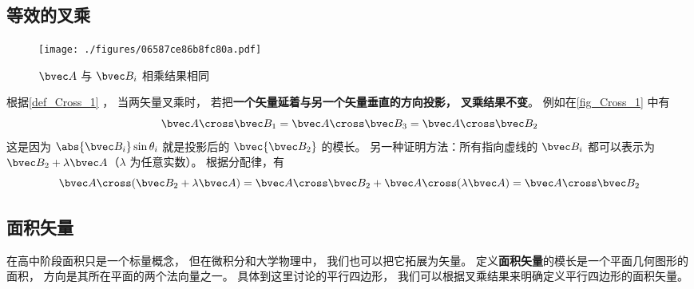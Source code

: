 
\subsection{等效的叉乘}\label{sub_Cross_1}
\begin{figure}[ht]
\centering
\texttt{[image: ./figures/06587ce86b8fc80a.pdf]}
\caption{$\bvec A$ 与 $\bvec B_i$ 相乘结果相同} \label{fig_Cross_1}
\end{figure}

根据\autoref{def_Cross_1} ， 当两矢量叉乘时， 若把\textbf{一个矢量延着与另一个矢量垂直的方向投影， 叉乘结果不变}。 例如在\autoref{fig_Cross_1} 中有
\begin{equation}
\bvec A\cross\bvec B_1 = \bvec A \cross \bvec B_3 = \bvec A\cross \bvec B_2
\end{equation}
这是因为 $\abs{\bvec B_i}\sin\theta_i$ 就是投影后的 $\bvec{\bvec B_2}$ 的模长。 另一种证明方法：所有指向虚线的 $\bvec B_i$ 都可以表示为 $\bvec B_2 + \lambda \bvec A$（$\lambda$ 为任意实数）。 根据分配律，有
\begin{equation}
\bvec A \cross (\bvec B_2 + \lambda \bvec A) = \bvec A \cross \bvec B_2 + \bvec A \cross (\lambda \bvec A) = \bvec A \cross \bvec B_2
\end{equation}

\subsection{面积矢量}
在高中阶段面积只是一个标量概念， 但在微积分和大学物理中， 我们也可以把它拓展为矢量。 定义\textbf{面积矢量}的模长是一个平面几何图形的面积， 方向是其所在平面的两个法向量之一。 具体到这里讨论的平行四边形， 我们可以根据叉乘结果来明确定义平行四边形的面积矢量。

